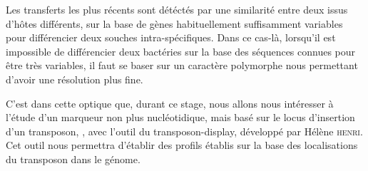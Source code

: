 Les transferts les plus récents sont détéctés par une similarité entre deux
 issus d'hôtes différents, sur la base de gènes habituellement
suffisamment variables pour différencier deux souches intra-spécifiques. Dans
ce cas-là, lorsqu'il est impossible de différencier deux bactéries sur la base
des séquences connues pour être très variables, il faut se baser sur un
caractère polymorphe nous permettant d'avoir une résolution plus fine.

C'est dans cette optique que, durant ce stage, nous allons nous intéresser à
l'étude  d'un marqueur non plus nucléotidique, mais basé sur le locus
d'insertion d'un transposon, , avec l'outil du transposon-display,
développé par Hélène \textsc{henri}\cite{memHH}.  Cet outil nous permettra
d'établir des profils établis sur la base des localisations du transposon dans
le génome.
